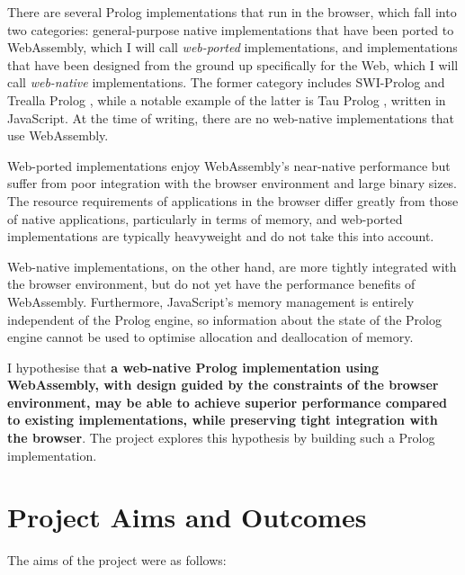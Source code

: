There are several Prolog implementations that run in the browser, which fall into two categories: general-purpose native implementations that have been ported to WebAssembly, which I will call \emph{web-ported} implementations, and implementations that have been designed from the ground up specifically for the Web, which I will call \emph{web-native} implementations. The former category includes SWI-Prolog \cite{wielemakerSWIProlog2012} and Trealla Prolog \cite{davisonTreallaProloghttps2020}, while a notable example of the latter is Tau Prolog \cite{riazaTauPrologProlog2024}, written in JavaScript. At the time of writing, there are no web-native implementations that use WebAssembly.

Web-ported implementations enjoy WebAssembly's near-native performance but suffer from poor integration with the browser environment and large binary sizes. The resource requirements of applications in the browser differ greatly from those of native applications, particularly in terms of memory, and web-ported implementations are typically heavyweight and do not take this into account.

Web-native implementations, on the other hand, are more tightly integrated with the browser environment, but do not yet have the performance benefits of WebAssembly. Furthermore, JavaScript's memory management is entirely independent of the Prolog engine, so information about the state of the Prolog engine cannot be used to optimise allocation and deallocation of memory.

I hypothesise that \textbf{a web-native Prolog implementation using WebAssembly, with design guided by the constraints of the browser environment, may be able to achieve superior performance compared to existing implementations, while preserving tight integration with the browser}. The project explores this hypothesis by building such a Prolog implementation.

\section{Project Aims and Outcomes}

The aims of the project were as follows:

